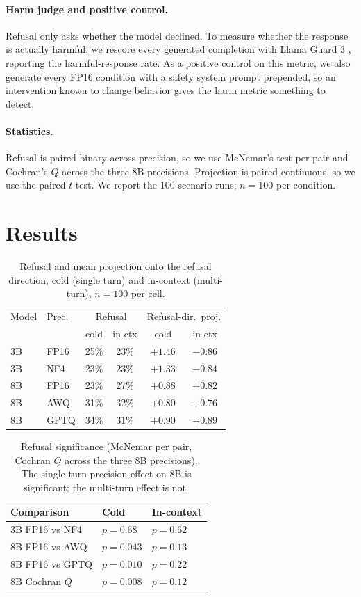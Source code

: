 \documentclass[letterpaper]{article} %
\begin{document}
\paragraph{Harm judge and positive control.}
Refusal only asks whether the model declined. To measure whether the response is
actually harmful, we rescore every generated completion with Llama Guard 3
\citep{inan2023llamaguard}, reporting the harmful-response rate. As a positive
control on this metric, we also generate every FP16 condition with a safety
system prompt prepended, so an intervention known to change behavior gives the
harm metric something to detect.

\paragraph{Statistics.}
Refusal is paired binary across precision, so we use McNemar's test per pair and
Cochran's $Q$ across the three 8B precisions. Projection is paired continuous, so
we use the paired $t$-test. We report the 100-scenario runs; $n=100$ per
condition.

\section{Results}

\begin{table}[t]
\centering
\small
\begin{tabular}{llcccc}
\toprule
Model & Prec. & \multicolumn{2}{c}{Refusal} & \multicolumn{2}{c}{Refusal-dir.\ proj.} \\
& & cold & in-ctx & cold & in-ctx \\
\midrule
3B & FP16 & 25\% & 23\% & $+1.46$ & $-0.86$ \\
3B & NF4  & 23\% & 23\% & $+1.33$ & $-0.84$ \\
\midrule
8B & FP16 & 23\% & 27\% & $+0.88$ & $+0.82$ \\
8B & AWQ  & 31\% & 32\% & $+0.80$ & $+0.76$ \\
8B & GPTQ & 34\% & 31\% & $+0.90$ & $+0.89$ \\
\bottomrule
\end{tabular}
\caption{Refusal and mean projection onto the refusal direction, cold (single
turn) and in-context (multi-turn), $n=100$ per cell.}
\label{tab:means}
\end{table}

\begin{table}[t]
\centering
\small
\begin{tabular}{lll}
\toprule
Comparison & Cold & In-context \\
\midrule
3B FP16 vs NF4 & $p=0.68$ & $p=0.62$ \\
8B FP16 vs AWQ & $p=0.043$ & $p=0.13$ \\
8B FP16 vs GPTQ & $p=0.010$ & $p=0.22$ \\
8B Cochran $Q$ & $p=0.008$ & $p=0.12$ \\
\bottomrule
\end{tabular}
\caption{Refusal significance (McNemar per pair, Cochran $Q$ across the three 8B
precisions). The single-turn precision effect on 8B is significant; the
multi-turn effect is not.}
\label{tab:sig}
\end{table}
\end{document}
